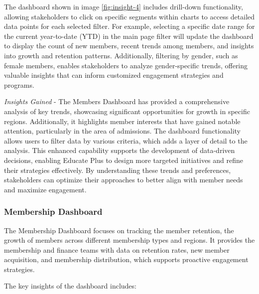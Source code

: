\documentclass[11pt,a4paper,]{article}
\begin{document}
The dashboard shown in image \ref{fig:insight-4} includes drill-down functionality, allowing stakeholders to click on specific segments within charts to access detailed data points for each selected filter.
For example, selecting a specific date range for the current year-to-date (YTD) in the main page filter will update the dashboard to display the count of new members, recent trends among members, and insights into growth and retention patterns. Additionally, filtering by gender, such as female members, enables stakeholders to analyze gender-specific trends, offering valuable insights that can inform customized engagement strategies and programs.

\emph{Insights Gained} - The Members Dashboard has provided a comprehensive analysis of key trends, showcasing significant opportunities for growth in specific regions. Additionally, it highlights member interests that have gained notable attention, particularly in the area of admissions. The dashboard functionality allows users to filter data by various criteria, which adds a layer of detail to the analysis. This enhanced capability supports the development of data-driven decisions, enabling Educate Plus to design more targeted initiatives and refine their strategies effectively. By understanding these trends and preferences, stakeholders can optimize their approaches to better align with member needs and maximize engagement.

\subsubsection{Membership Dashboard}\label{membership-dashboard}

The Membership Dashboard focuses on tracking the member retention, the growth of members across different membership types and regions. It provides the membership and finance teams with data on retention rates, new member acquisition, and membership distribution, which supports proactive engagement strategies.

The key insights of the dashboard includes:
\end{document}
